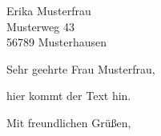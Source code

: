 \documentclass[
  fontsize=12pt,                %
  version=last                  %
]{scrlttr2}
\begin{document}
    \begin{letter}{%
        Erika Musterfrau\\
        Musterweg 43\\
        56789 Musterhausen%
        }




        \opening{Sehr geehrte Frau Musterfrau,}

        hier kommt der Text hin.

        \closing{Mit freundlichen Grüßen,}




    \end{letter}
\end{document}
